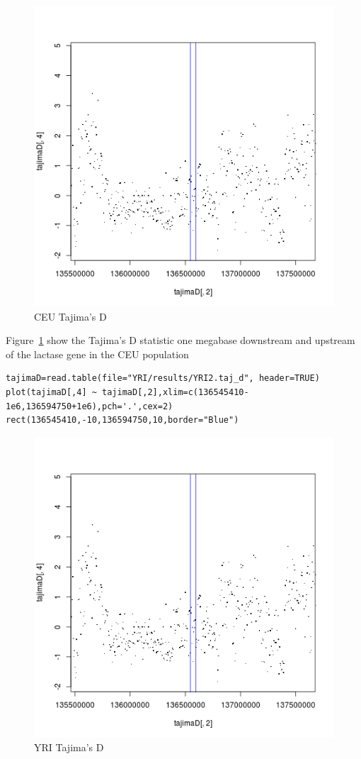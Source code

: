 \begin{figure}
\centering
\includegraphics{pictures/CEUtajimas.png}
\caption{CEU Tajima's D}
\label{fig:tajceu}
\end{figure}

Figure~\ref{fig:tajceu} show the Tajima's D statistic one megabase downstream and upstream of the lactase gene in the CEU population

\begin{verbatim}
tajimaD=read.table(file="YRI/results/YRI2.taj_d", header=TRUE)
plot(tajimaD[,4] ~ tajimaD[,2],xlim=c(136545410-1e6,136594750+1e6),pch='.',cex=2)
rect(136545410,-10,136594750,10,border="Blue") 
\end{verbatim}

\begin{figure}
\centering
\includegraphics{pictures/CEUtajimas.png}
\caption{YRI Tajima's D}
\label{fig:tajyri}
\end{figure}

